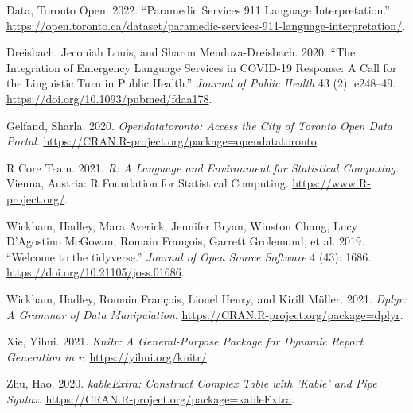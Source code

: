 \documentclass[
  letterpaper,
  DIV=11,
  numbers=noendperiod]{scrartcl}
\newlength{\cslhangindent}
\newlength{\cslentryspacingunit} %
\newenvironment{CSLReferences}[2] %
 {%
  \setlength{\parindent}{0pt}
  \ifodd #1
  \let\oldpar\par
  \def\par{\hangindent=\cslhangindent\oldpar}
  \fi
  \setlength{\parskip}{#2\cslentryspacingunit}
 }%
 {}
\begin{document}
\hypertarget{refs}{}
\begin{CSLReferences}{1}{0}
\leavevmode{}%
Data, Toronto Open. 2022. {``Paramedic Services 911 Language
Interpretation.''}
\url{https://open.toronto.ca/dataset/paramedic-services-911-language-interpretation/}.

\leavevmode{}%
Dreisbach, Jeconiah Louis, and Sharon Mendoza-Dreisbach. 2020. {``The
Integration of Emergency Language Services in {COVID}-19 Response: A
Call for the Linguistic Turn in Public Health.''} \emph{Journal of
Public Health} 43 (2): e248--49.
\url{https://doi.org/10.1093/pubmed/fdaa178}.

\leavevmode{}%
Gelfand, Sharla. 2020. \emph{Opendatatoronto: Access the City of Toronto
Open Data Portal}.
\url{https://CRAN.R-project.org/package=opendatatoronto}.

\leavevmode{}%
R Core Team. 2021. \emph{R: A Language and Environment for Statistical
Computing}. Vienna, Austria: R Foundation for Statistical Computing.
\url{https://www.R-project.org/}.

\leavevmode{}%
Wickham, Hadley, Mara Averick, Jennifer Bryan, Winston Chang, Lucy
D'Agostino McGowan, Romain François, Garrett Grolemund, et al. 2019.
{``Welcome to the {tidyverse}.''} \emph{Journal of Open Source Software}
4 (43): 1686. \url{https://doi.org/10.21105/joss.01686}.

\leavevmode{}%
Wickham, Hadley, Romain François, Lionel Henry, and Kirill Müller. 2021.
\emph{Dplyr: A Grammar of Data Manipulation}.
\url{https://CRAN.R-project.org/package=dplyr}.

\leavevmode{}%
Xie, Yihui. 2021. \emph{Knitr: A General-Purpose Package for Dynamic
Report Generation in r}. \url{https://yihui.org/knitr/}.

\leavevmode{}%
Zhu, Hao. 2020. \emph{kableExtra: Construct Complex Table with 'Kable'
and Pipe Syntax}. \url{https://CRAN.R-project.org/package=kableExtra}.

\end{CSLReferences}
\end{document}
